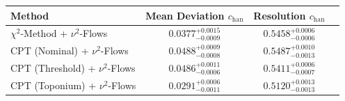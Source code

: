     \begin{tabular}{lccc}
        \toprule
        Method & Mean Deviation $c_{\text{han}}$ & Resolution $c_{\text{han}}$ \\
        \midrule
        $\chi^2$-Method + $\nu^2$-Flows & $0.0377^{+0.0015}_{-0.0009}$ & $0.5458^{+0.0006}_{-0.0006}$ \\
        CPT (Nominal) + $\nu^2$-Flows & $0.0488^{+0.0009}_{-0.0008}$ & $0.5487^{+0.0010}_{-0.0013}$ \\
        CPT (Threshold) + $\nu^2$-Flows & $0.0486^{+0.0011}_{-0.0006}$ & $0.5411^{+0.0006}_{-0.0007}$ \\
        CPT (Toponium) + $\nu^2$-Flows & $0.0291^{+0.0006}_{-0.0011}$ & $0.5120^{+0.0013}_{-0.0013}$ \\
        \bottomrule
    \end{tabular}